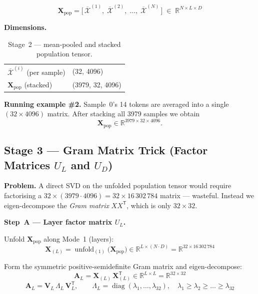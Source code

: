 \documentclass[11pt,a4paper]{article}
\DeclareMathOperator{\unfold}{unfold}
\DeclareMathOperator{\diag}{diag}
\begin{document}
\[
\mathbf{X}_{\text{pop}} = \bigl[\,\overline{\mathcal{X}}^{(1)},\;
                              \overline{\mathcal{X}}^{(2)},\; \dots,\;
                              \overline{\mathcal{X}}^{(N)}\,\bigr]
                        \;\in\; \mathbb{R}^{N \times L \times D}
\]

\noindent
\textbf{Dimensions.}

\begin{table}[H]
\centering
\begin{tabular}{>{\ttfamily}l>{\ttfamily}l}
\toprule
\multicolumn{1}{c}{\textbf{Tensor}} & \multicolumn{1}{c}{\textbf{Shape}} \\
\midrule
$\overline{\mathcal{X}}^{(i)}$ (per sample) & (32, 4096) \\
$\mathbf{X}_{\text{pop}}$ (stacked) & (3979, 32, 4096) \\
\bottomrule
\end{tabular}
\caption{Stage~2 — mean-pooled and stacked population tensor.}
\end{table}

\noindent
\textbf{Running example \#2.}
Sample~0's 14 tokens are averaged into a single $(32 \times 4096)$ matrix.
After stacking all 3979 samples we obtain
\[
\mathbf{X}_{\text{pop}} \in \mathbb{R}^{3979 \times 32 \times 4096}.
\]

\subsection{Stage 3 — Gram Matrix Trick (Factor Matrices $U_L$ and $U_D$)}

\textbf{Problem.}
A direct SVD on the unfolded population tensor would require factorising a
$32 \times (3979\cdot 4096) = 32 \times 16\,302\,784$ matrix — wasteful.
Instead we eigen-decompose the \emph{Gram matrix} $X X^{\mathsf{T}}$,
which is only $32 \times 32$.

\medskip
\noindent
\textbf{Step~A — Layer factor matrix $U_L$.}

Unfold $\mathbf{X}_{\text{pop}}$ along Mode~1 (layers):
\[
\mathbf{X}_{(L)} = \unfold_{(1)}\!\bigl(\mathbf{X}_{\text{pop}}\bigr)
                 \in \mathbb{R}^{L \times (N \cdot D)}
                 = \mathbb{R}^{32 \times 16\,302\,784}
\]

Form the symmetric positive-semidefinite Gram matrix and eigen-decompose:
\[
\mathbf{A}_L = \mathbf{X}_{(L)} \, \mathbf{X}_{(L)}^{\mathsf{T}}
             \in \mathbb{R}^{L \times L}
             = \mathbb{R}^{32 \times 32}
\]
\[
\mathbf{A}_L = \mathbf{V}_L \, \Lambda_L \, \mathbf{V}_L^{\mathsf{T}},
\qquad
\Lambda_L = \diag(\lambda_1,\dots,\lambda_{32}),\quad
\lambda_1 \ge \lambda_2 \ge \dots \ge \lambda_{32}
\]
\end{document}

